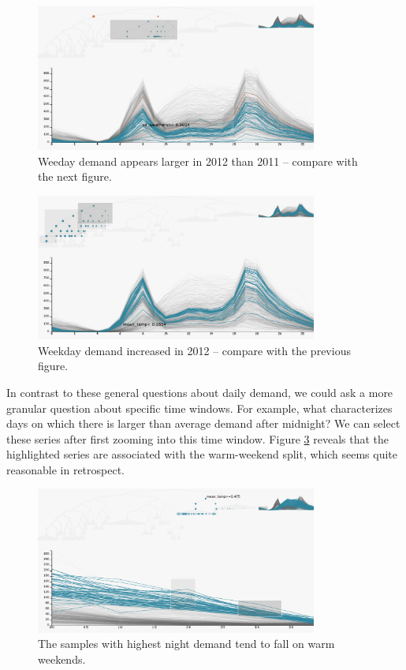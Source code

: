\documentclass[12pt]{article}
\begin{document}
\begin{figure}

{\centering \includegraphics[width=350px]{figure/weekday_2011}

}

\caption{Weeday demand appears larger in 2012 than 2011 -- compare with the next
  figure.}\label{fig:weekday2011}
\end{figure}

\begin{figure}

{\centering \includegraphics[width=350px]{figure/weekday_2012}

}

\caption{Weekday demand increased in 2012 -- compare with the previous
  figure.}\label{fig:weekday2012}
\end{figure}

In contrast to these general questions about daily demand, we could ask
a more granular question about specific time windows. For example, what
characterizes days on which there is larger than average demand after
midnight? We can select these series after first zooming into this time window.
Figure \ref{fig:warmweekend} reveals that the highlighted series are associated
with the warm-weekend split, which seems quite reasonable in retrospect.

\begin{figure}

{\centering \includegraphics[width=350px]{figure/warm_weekend}

}

\caption{The samples with highest night demand tend to fall on warm
  weekends.}\label{fig:warmweekend}
\end{figure}
\end{document}
